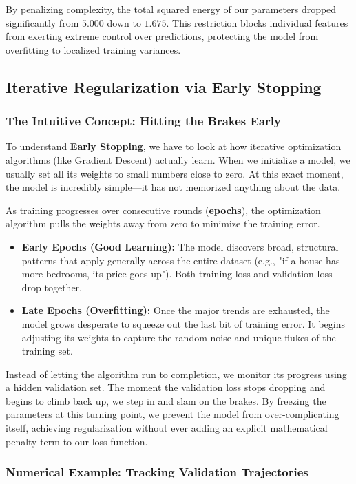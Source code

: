 \documentclass{article}
\begin{document}
By penalizing complexity, the total squared energy of our parameters dropped significantly from $5.000$ down to $1.675$. This restriction blocks individual features from exerting extreme control over predictions, protecting the model from overfitting to localized training variances.

\subsection{Iterative Regularization via Early Stopping}

\subsubsection{The Intuitive Concept: Hitting the Brakes Early}
To understand \textbf{Early Stopping}, we have to look at how iterative optimization algorithms (like Gradient Descent) actually learn. When we initialize a model, we usually set all its weights to small numbers close to zero. At this exact moment, the model is incredibly simple—it has not memorized anything about the data. 

As training progresses over consecutive rounds (\textbf{epochs}), the optimization algorithm pulls the weights away from zero to minimize the training error. 
\begin{itemize}
    \item \textbf{Early Epochs (Good Learning):} The model discovers broad, structural patterns that apply generally across the entire dataset (e.g., "if a house has more bedrooms, its price goes up"). Both training loss and validation loss drop together.
    \item \textbf{Late Epochs (Overfitting):} Once the major trends are exhausted, the model grows desperate to squeeze out the last bit of training error. It begins adjusting its weights to capture the random noise and unique flukes of the training set. 
\end{itemize}

Instead of letting the algorithm run to completion, we monitor its progress using a hidden validation set. The moment the validation loss stops dropping and begins to climb back up, we step in and slam on the brakes. By freezing the parameters at this turning point, we prevent the model from over-complicating itself, achieving regularization without ever adding an explicit mathematical penalty term to our loss function.

\subsubsection{Numerical Example: Tracking Validation Trajectories}
\end{document}
